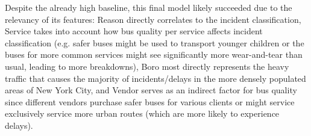 \documentclass[11pt]{article}
\begin{document}
Despite the already high baseline, this final model likely succeeded due to the relevancy of its features: Reason directly correlates to the incident classification, Service takes into account how bus quality per service affects incident classification (e.g. safer buses might be used to transport younger children or the buses for more common services might see significantly more wear-and-tear than usual, leading to more breakdowns), Boro most directly represents the heavy traffic that causes the majority of incidents/delays in the more densely populated areas of New York City, and Vendor serves as an indirect factor for bus quality since different vendors purchase safer buses for various clients or might service exclusively service more urban routes (which are more likely to experience delays).
\end{document}
